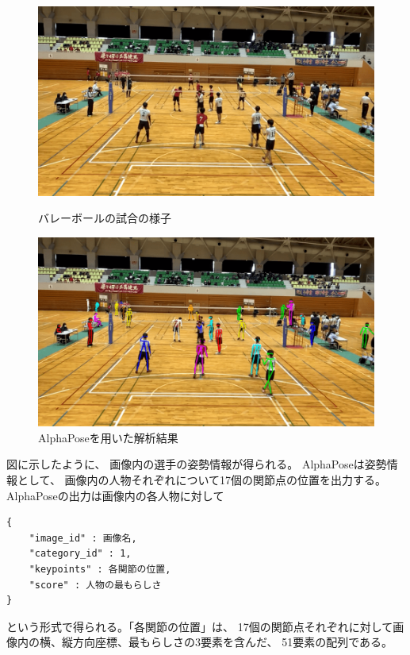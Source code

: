 \documentclass[a4j, fleqn, 12pt]{jsreport}
\begin{document}
        \begin{figure}[ht]
            \begin{minipage}{0.49\hsize}
                \centering
                \includegraphics[width=1\hsize]{images/frame.png}
                \caption{バレーボールの試合の様子}
                \label{fig:frame}
            \end{minipage}
            \begin{minipage}{0.49\hsize}
                \centering
                \includegraphics[width=1\hsize]{images/posed.png}
                \caption{AlphaPoseを用いた解析結果}
                \label{fig:posed}
            \end{minipage}
        \end{figure}

        図に示したように、
        画像内の選手の姿勢情報が得られる。
        AlphaPoseは姿勢情報として、
        画像内の人物それぞれについて17個の関節点の位置を出力する。
        AlphaPoseの出力は画像内の各人物に対して

        \begin{verbatim}
{
    "image_id" : 画像名,
    "category_id" : 1,
    "keypoints" : 各関節の位置,
    "score" : 人物の最もらしさ
}
        \end{verbatim}
        という形式で得られる。「各関節の位置」は、
        17個の関節点それぞれに対して画像内の横、縦方向座標、最もらしさの3要素を含んだ、
        51要素の配列である。
\end{document}
